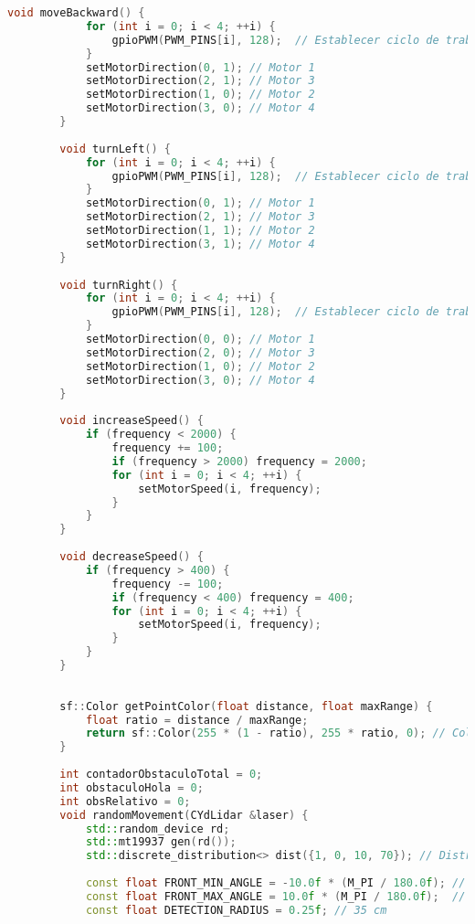 \begin{lstlisting}[language={C++}, caption={Primer ajuste de c\'odigo}, label={Script}]
        void moveBackward() {
            for (int i = 0; i < 4; ++i) {
                gpioPWM(PWM_PINS[i], 128);  // Establecer ciclo de trabajo al 50%
            }
            setMotorDirection(0, 1); // Motor 1
            setMotorDirection(2, 1); // Motor 3
            setMotorDirection(1, 0); // Motor 2
            setMotorDirection(3, 0); // Motor 4
        }
        
        void turnLeft() {
            for (int i = 0; i < 4; ++i) {
                gpioPWM(PWM_PINS[i], 128);  // Establecer ciclo de trabajo al 50%
            }
            setMotorDirection(0, 1); // Motor 1
            setMotorDirection(2, 1); // Motor 3
            setMotorDirection(1, 1); // Motor 2
            setMotorDirection(3, 1); // Motor 4
        }
        
        void turnRight() {
            for (int i = 0; i < 4; ++i) {
                gpioPWM(PWM_PINS[i], 128);  // Establecer ciclo de trabajo al 50%
            }
            setMotorDirection(0, 0); // Motor 1
            setMotorDirection(2, 0); // Motor 3
            setMotorDirection(1, 0); // Motor 2
            setMotorDirection(3, 0); // Motor 4
        }
        
        void increaseSpeed() {
            if (frequency < 2000) {
                frequency += 100;
                if (frequency > 2000) frequency = 2000;
                for (int i = 0; i < 4; ++i) {
                    setMotorSpeed(i, frequency);
                }
            }
        }
        
        void decreaseSpeed() {
            if (frequency > 400) {
                frequency -= 100;
                if (frequency < 400) frequency = 400;
                for (int i = 0; i < 4; ++i) {
                    setMotorSpeed(i, frequency);
                }
            }
        }
        
        
        sf::Color getPointColor(float distance, float maxRange) {
            float ratio = distance / maxRange;
            return sf::Color(255 * (1 - ratio), 255 * ratio, 0); // Color de rojo a verde
        }
        
        int contadorObstaculoTotal = 0;
        int obstaculoHola = 0;
        int obsRelativo = 0;
        void randomMovement(CYdLidar &laser) {
            std::random_device rd;
            std::mt19937 gen(rd());
            std::discrete_distribution<> dist({1, 0, 10, 70}); // Distribucin para la probabilidad de movimiento
        
            const float FRONT_MIN_ANGLE = -10.0f * (M_PI / 180.0f); // -15 grados en radaianes
            const float FRONT_MAX_ANGLE = 10.0f * (M_PI / 180.0f);  // 15 grados en radianes
            const float DETECTION_RADIUS = 0.25f; // 35 cm
        

\end{lstlisting}
